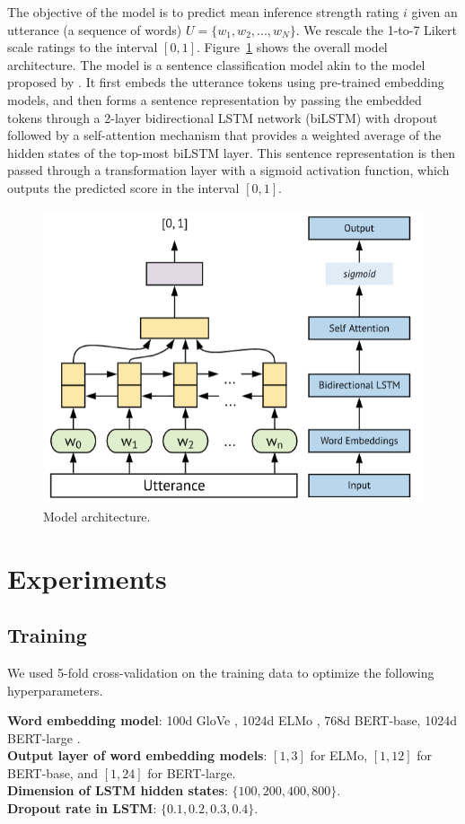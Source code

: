 \documentclass[11pt,a4paper]{article}
\begin{document}
The objective of the model is to predict mean inference strength rating $i$ given an utterance (a sequence of words) $U = \{w_1,w_2,...,w_N\}$. We rescale the 1-to-7 Likert scale ratings to the interval $[0,1]$. Figure~\ref{fig:model-architecture} shows the overall model architecture. The model is a sentence classification model akin to the model proposed by \citet{lin2017structured}. It first embeds the utterance tokens using  pre-trained embedding models, and then forms a sentence representation by passing the embedded tokens through a 2-layer bidirectional LSTM network (biLSTM) \cite{hochreiter1997long} with dropout \cite{srivastava2014dropout} followed by a self-attention mechanism that provides a weighted average of the hidden states of the top-most biLSTM layer. This sentence representation is then passed through a transformation layer with a sigmoid activation function, which outputs the predicted score in the interval $[0,1]$.
\begin{figure}[t]
	\includegraphics[width=.48\textwidth]{./images/arch.png}
	\caption{Model architecture.}
		\label{fig:model-architecture}
\end{figure}

 
\section{Experiments}




\subsection{Training}

We used 5-fold cross-validation on the training data to optimize the following hyperparameters.

\noindent \textbf{Word embedding model}: 100d GloVe \cite{pennington2014glove}, 1024d ELMo \cite{peters2018deep,gardner2018allennlp}, 768d BERT-base, 1024d BERT-large \cite{devlin2019bert,wolf2019transformers}.\\
\textbf{Output layer of word embedding models}: $[1,3]$ for ELMo, $[1,12]$ for BERT-base, and $[1,24]$ for BERT-large.\\
\textbf{Dimension of LSTM hidden states}: $\{100,200,400,800\}$.\\
\textbf{Dropout rate in LSTM}: $\{0.1,0.2,0.3,0.4\}$. 
\end{document}
